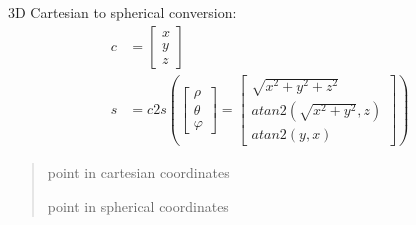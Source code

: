 \documentclass[letterpaper,10pt,english]{sphinxmanual}
\begin{document}
\begin{fulllineitems}
\label{\detokenize{conversions:conversions.c2s}}
\pysigstartsignatures
{}
\pysigstopsignatures
\sphinxAtStartPar
3D Cartesian to spherical conversion:
\begin{equation}\label{equation:conversions:eq-c2s}
\begin{split}c &= \begin{bmatrix} x \\ y \\ z \end{bmatrix} \\
s & = c2s \left(\begin{bmatrix} \rho \\ \theta \\ \varphi \end{bmatrix} = \begin{bmatrix} \sqrt{x^2+y^2+z^2} \\ atan2(\sqrt{x^2+y^2},{z}) \\ atan2({y},{x}) \end{bmatrix}\right)\end{split}
\end{equation}\begin{quote}\begin{description}
\sphinxAtStartPar
{} \textendash{} point in cartesian coordinates

\sphinxAtStartPar
point in spherical coordinates

\end{description}\end{quote}

\end{fulllineitems}

\end{document}
